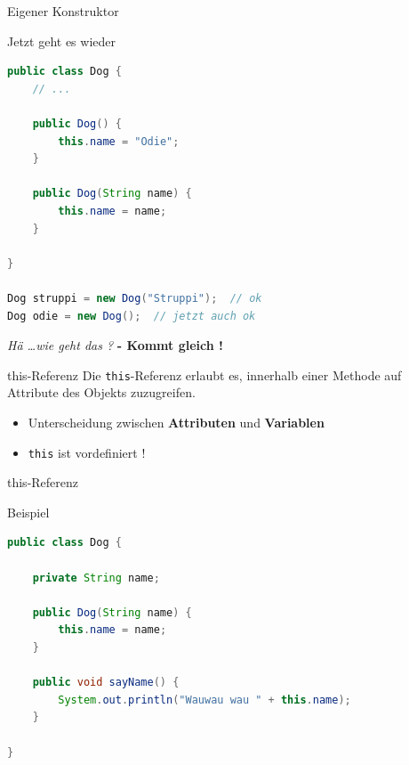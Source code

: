 \documentclass[18pt]{beamer}
\begin{document}
\begin{frame}[fragile]{Eigener Konstruktor}
    \begin{exampleblock}{Jetzt geht es wieder}
        \begin{lstlisting}[language=Java,basicstyle=\scriptsize]
public class Dog {
    // ...

    public Dog() {
        this.name = "Odie";
    }

    public Dog(String name) {
        this.name = name;
    }

}

Dog struppi = new Dog("Struppi");  // ok
Dog odie = new Dog();  // jetzt auch ok
        \end{lstlisting}

    \end{exampleblock}

    \pause
    \textit{Hä \dots wie geht das ?}
    \pause
    \textbf{- Kommt gleich !}

\end{frame}


\begin{frame}{this-Referenz}
    Die \texttt{this}-Referenz erlaubt es, innerhalb einer Methode auf Attribute des Objekts zuzugreifen.
    \begin{itemize}
        \item Unterscheidung zwischen \textbf{Attributen} und \textbf{Variablen}
        \item \texttt{this} ist vordefiniert !
    \end{itemize}
\end{frame}

\begin{frame}[fragile]{this-Referenz}
    \begin{exampleblock}{Beispiel}
        \begin{lstlisting}[language=Java]
public class Dog {

    private String name;

    public Dog(String name) {
        this.name = name;
    }

    public void sayName() {
        System.out.println("Wauwau wau " + this.name);
    }

}
        \end{lstlisting}

    \end{exampleblock}

\end{frame}

\end{document}
